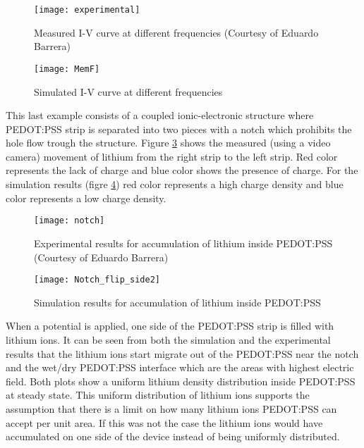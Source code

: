 \begin{doublespace}
\begin{figure}[!htp]
\centering
\texttt{[image: experimental]}
\caption{Measured I-V curve at different frequencies (Courtesy of Eduardo Barrera)\cite{eduardo2}} 
\label{experimental}
\end{figure}

\begin{figure}[!htp]
\centering
\texttt{[image: MemF]}
\caption{Simulated I-V curve at different frequencies } 
\label{MemF}
\end{figure}

\clearpage
This last example consists of a coupled ionic-electronic structure where PEDOT:PSS strip is separated into two pieces with a notch which prohibits the hole flow trough the structure. Figure \ref{notch} shows the measured (using a video camera) movement of lithium from the right strip to the left strip. Red color represents the lack of charge and blue color shows the presence of charge. For the simulation results (figre \ref{Notch_flip_side}) red color represents a high charge density and blue color represents a low charge density.

\begin{figure}[!htp]
\centering
\texttt{[image: notch]}
\caption{Experimental results for accumulation of lithium inside PEDOT:PSS (Courtesy of Eduardo Barrera)\cite{eduardo2}} 
\label{notch}
\end{figure}

\begin{figure}[!htp]
\centering
\texttt{[image: Notch\_flip\_side2]}
\caption{Simulation results for accumulation of lithium inside PEDOT:PSS} 
\label{Notch_flip_side}
\end{figure}

When a potential is applied, one side of the PEDOT:PSS strip is filled with lithium ions. It can be seen from both the simulation and the experimental results that the lithium ions start migrate out of the PEDOT:PSS near the notch and the wet/dry PEDOT:PSS interface which are the areas with highest electric field. Both plots show a uniform lithium density distribution inside PEDOT:PSS at steady state. This uniform distribution of lithium ions supports the assumption that there is a limit on how many lithium ions PEDOT:PSS can accept per unit area. If this was not the case the lithium ions would have accumulated on one side of the device instead of being uniformly distributed.


\end{doublespace}

